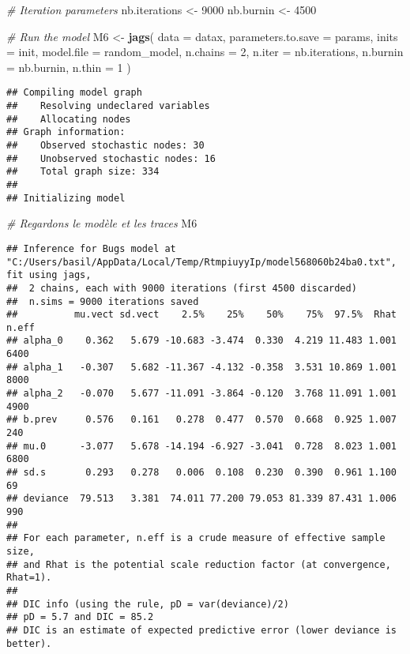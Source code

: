 \documentclass[
]{article}
\newenvironment{Shaded}{\begin{snugshade}}{\end{snugshade}}
\newcommand{\AttributeTok}[1]{\textcolor[rgb]{0.13,0.29,0.53}{#1}}
\newcommand{\CommentTok}[1]{\textcolor[rgb]{0.56,0.35,0.01}{\textit{#1}}}
\newcommand{\DecValTok}[1]{\textcolor[rgb]{0.00,0.00,0.81}{#1}}
\newcommand{\FunctionTok}[1]{\textcolor[rgb]{0.13,0.29,0.53}{\textbf{#1}}}
\newcommand{\NormalTok}[1]{#1}
\newcommand{\OtherTok}[1]{\textcolor[rgb]{0.56,0.35,0.01}{#1}}
\begin{document}
\begin{Shaded}
\begin{Highlighting}[]
\CommentTok{\# Iteration parameters}
\NormalTok{nb.iterations }\OtherTok{\textless{}{-}} \DecValTok{9000}
\NormalTok{nb.burnin }\OtherTok{\textless{}{-}} \DecValTok{4500}

\CommentTok{\# Run the model}
\NormalTok{M6 }\OtherTok{\textless{}{-}} \FunctionTok{jags}\NormalTok{(}
  \AttributeTok{data =}\NormalTok{ datax,}
  \AttributeTok{parameters.to.save =}\NormalTok{ params,}
  \AttributeTok{inits =}\NormalTok{ init,}
  \AttributeTok{model.file =}\NormalTok{ random\_model,}
  \AttributeTok{n.chains =} \DecValTok{2}\NormalTok{,}
  \AttributeTok{n.iter =}\NormalTok{ nb.iterations,}
  \AttributeTok{n.burnin =}\NormalTok{ nb.burnin,}
  \AttributeTok{n.thin =} \DecValTok{1}
\NormalTok{)}
\end{Highlighting}
\end{Shaded}

\begin{verbatim}
## Compiling model graph
##    Resolving undeclared variables
##    Allocating nodes
## Graph information:
##    Observed stochastic nodes: 30
##    Unobserved stochastic nodes: 16
##    Total graph size: 334
## 
## Initializing model
\end{verbatim}

\begin{Shaded}
\begin{Highlighting}[]
\CommentTok{\# Regardons le modèle et les traces}
\NormalTok{M6}
\end{Highlighting}
\end{Shaded}

\begin{verbatim}
## Inference for Bugs model at "C:/Users/basil/AppData/Local/Temp/RtmpiuyyIp/model568060b24ba0.txt", fit using jags,
##  2 chains, each with 9000 iterations (first 4500 discarded)
##  n.sims = 9000 iterations saved
##          mu.vect sd.vect    2.5%    25%    50%    75%  97.5%  Rhat n.eff
## alpha_0    0.362   5.679 -10.683 -3.474  0.330  4.219 11.483 1.001  6400
## alpha_1   -0.307   5.682 -11.367 -4.132 -0.358  3.531 10.869 1.001  8000
## alpha_2   -0.070   5.677 -11.091 -3.864 -0.120  3.768 11.091 1.001  4900
## b.prev     0.576   0.161   0.278  0.477  0.570  0.668  0.925 1.007   240
## mu.0      -3.077   5.678 -14.194 -6.927 -3.041  0.728  8.023 1.001  6800
## sd.s       0.293   0.278   0.006  0.108  0.230  0.390  0.961 1.100    69
## deviance  79.513   3.381  74.011 77.200 79.053 81.339 87.431 1.006   990
## 
## For each parameter, n.eff is a crude measure of effective sample size,
## and Rhat is the potential scale reduction factor (at convergence, Rhat=1).
## 
## DIC info (using the rule, pD = var(deviance)/2)
## pD = 5.7 and DIC = 85.2
## DIC is an estimate of expected predictive error (lower deviance is better).
\end{verbatim}
\end{document}
